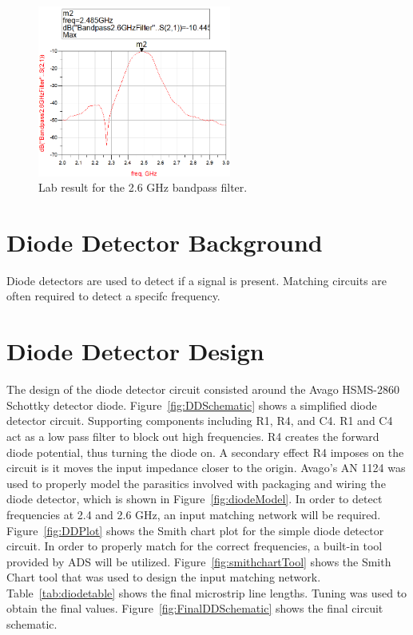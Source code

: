 \documentclass[conference]{IEEEtran}
\begin{document}
\begin{figure}[!htb]
\centering
\includegraphics[width=2.5in]{bandpass-pics/bpf26.png}
\caption{Lab result for the 2.6 GHz bandpass filter.}
\label{fig:bpf26}
\end{figure}

\section{Diode Detector Background}
Diode detectors are used to detect if a signal is present.  Matching circuits are often required to detect a specifc frequency.

\section{Diode Detector Design}
The design of the diode detector circuit consisted around the Avago HSMS-2860 Schottky detector diode.  Figure~\ref{fig:DDSchematic} shows a simplified diode detector circuit.  Supporting components including R1, R4, and C4.  R1 and C4 act as a low pass filter to block out high frequencies.  R4 creates the forward diode potential, thus turning the diode on.  A secondary effect R4 imposes on the circuit is it moves the input impedance closer to the origin.  Avago's AN 1124\cite{an1124} was used to properly model the parasitics involved with packaging and wiring the diode detector, which is shown in Figure~\ref{fig:diodeModel}.  In order to detect frequencies at 2.4 and 2.6 GHz, an input matching network will be required.  Figure~\ref{fig:DDPlot} shows the Smith chart plot for the simple diode detector circuit.  In order to properly match for the correct frequencies, a built-in tool provided by ADS will be utilized.  Figure~\ref{fig:smithchartTool} shows the Smith Chart tool that was used to design the input matching network.  Table~\ref{tab:diodetable} shows the final microstrip line lengths.  Tuning was used to obtain the final values.  Figure~\ref{fig:FinalDDSchematic} shows the final circuit schematic.  
\end{document}
